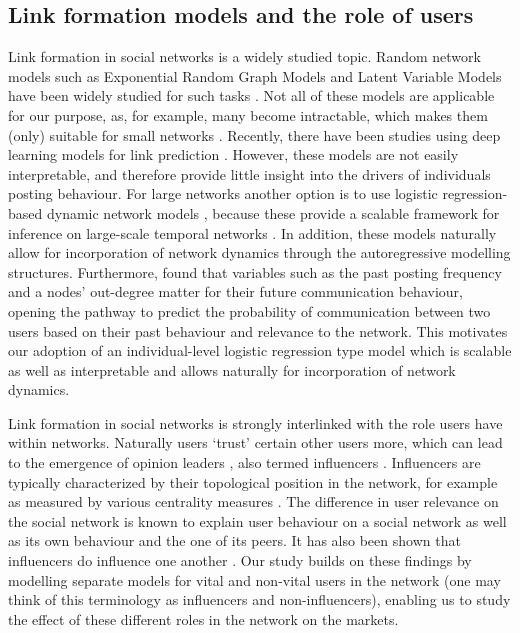 \subsection{Link formation models and the role of users}
Link formation in social networks is a widely studied topic. Random network models such as Exponential Random Graph Models and Latent Variable Models have been widely studied for such tasks \citep{kim2018review,Deng2024}. Not all of these models are applicable for our purpose, as, for example, many become intractable, which makes them (only) suitable for small networks \citep{Yon2021}. Recently, there have been studies using deep learning models for link prediction \citep{barros2021survey,yu2023towards,beladev2023graphert,hui2024domain}. However, these models are not easily interpretable, and therefore provide little insight into the drivers of individuals posting behaviour. For large networks another option is to use logistic regression-based dynamic network models \citep{agaskar2013alarm,almquist2013dynamic}, because these provide a scalable framework for inference on large-scale temporal networks \citep{mallik2019stable}. In addition, these models naturally allow for incorporation of network dynamics through the autoregressive modelling structures. Furthermore, \textcite{bhattacharya2019coevolution} found that variables such as the past posting frequency and a nodes' out-degree matter for their future communication behaviour, opening the pathway to predict the probability of communication between two users based on their past behaviour and relevance to the network. This motivates our adoption of an individual-level logistic regression type model which is scalable as well as interpretable and allows naturally for incorporation of network dynamics. %

Link formation in social networks is strongly interlinked with the role users have within networks. Naturally users `trust' certain other users more, which can lead to the emergence of opinion leaders \citep{Lu2013}, also termed influencers \citep{han2020importance, chen2022sonic}. Influencers are typically characterized by their topological position in the network, for example as measured by various centrality measures \citep{gelper2021competition}. The difference in user relevance on the social network is known to explain user behaviour on a social network \citep{Lu2013,zhang2018direct} as well as its own behaviour and the one of its peers. It has also been shown that influencers do influence one another \citep{Ji2025}. Our study builds on these findings by modelling separate models for vital and non-vital users in the network (one may think of this terminology as influencers and non-influencers), enabling us to study the effect of these different roles in the network on the markets.

